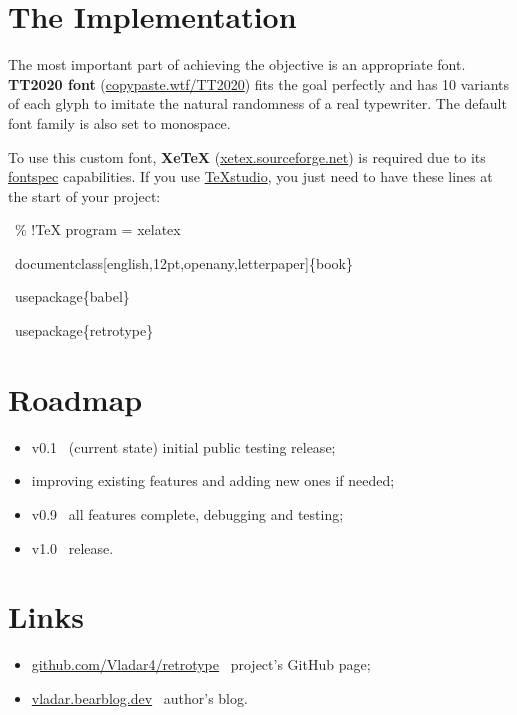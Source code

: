 \documentclass[english,12pt,openany,letterpaper]{book}
\begin{document}
\section{The Implementation}

The most important part of achieving the objective is an appropriate font. \textbf{TT2020 font} (\href{https://copypaste.wtf/TT2020/}{copypaste.wtf/TT2020}) fits the goal perfectly and has 10 variants of each glyph to imitate the natural randomness of a real typewriter. The default font family is also set to monospace.

\tab To use this custom font, \textbf{XeTeX} (\href{https://xetex.sourceforge.net/}{xetex.sourceforge.net}) is required due to its \href{https://ctan.org/pkg/fontspec}{fontspec} capabilities. If you use \href{https://www.texstudio.org/}{TeXstudio}, you just need to have these lines at the start of your project:

\begin{tabbox}[8][8]
\begin{textbox}
~\% !TeX program = xelatex

~\bs documentclass[english,12pt,openany,letterpaper]\{book\}

~\bs usepackage\{babel\}

~\bs usepackage\{retrotype\}
\end{textbox}
\end{tabbox}

\section{Roadmap}

\begin{itemize}
	\item v0.1 \dash\ (current state) initial public testing release;
	\item improving existing features and adding new ones if needed;
	\item v0.9 \dash\ all features complete, debugging and testing;
	\item v1.0 \dash\ release.
\end{itemize}

\skipline

\section{Links}

\begin{itemize}
	\item \href{https://github.com/Vladar4/retrotype}{github.com/Vladar4/retrotype} \dash\ project's GitHub page;
	\item \href{https://vladar.bearblog.dev}{vladar.bearblog.dev} \dash\ author's blog.
\end{itemize}
\end{document}
